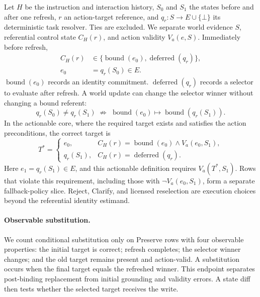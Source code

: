 \documentclass[letterpaper]{article}
\begin{document}
Let $H$ be the instruction and interaction history, $S_0$ and $S_1$ the states before and after one
refresh, $r$ an action-target reference, and $q_r:S\rightarrow E\cup\{\bot\}$ its deterministic
task resolver. Ties are excluded. We separate world evidence $S$, referential control state
$C_H(r)$, and action validity $V_a(e,S)$. Immediately before refresh,
\begin{equation}
\begin{aligned}
C_H(r)&\in\{\operatorname{bound}(e_0),\operatorname{deferred}(q_r)\},\\
e_0&=q_r(S_0)\in E.
\end{aligned}
\end{equation}
$\operatorname{bound}(e_0)$ records an identity commitment. $\operatorname{deferred}(q_r)$ records
a selector to evaluate after refresh. A world update can change the selector winner without
changing a bound referent:
\begin{equation}
q_r(S_0)\ne q_r(S_1)\;\not\Rightarrow\;
\operatorname{bound}(e_0)\mapsto\operatorname{bound}(q_r(S_1)).
\end{equation}
In the actionable core, where the required target exists and satisfies the action preconditions,
the correct target is
\begin{equation}
T^*=\begin{cases}
e_0, & C_H(r)=\operatorname{bound}(e_0)\land V_a(e_0,S_1),\\
q_r(S_1), & C_H(r)=\operatorname{deferred}(q_r).
\end{cases}
\end{equation}
Here $e_1=q_r(S_1)\in E$, and this actionable definition requires $V_a(T^*,S_1)$. Rows that violate
this requirement, including those with $\neg V_a(e_0,S_1)$, form a separate fallback-policy slice.
Reject, Clarify, and licensed
reselection are execution choices beyond the referential identity estimand.

\paragraph{Observable substitution.}
We count conditional substitution only on Preserve rows with four observable properties: the
initial target is correct; refresh completes; the selector winner changes; and the old target
remains present and action-valid. A substitution occurs when the final target equals the refreshed
winner. This endpoint separates post-binding replacement from initial grounding and validity
errors. A state diff then tests whether the selected target receives the write.
\end{document}
